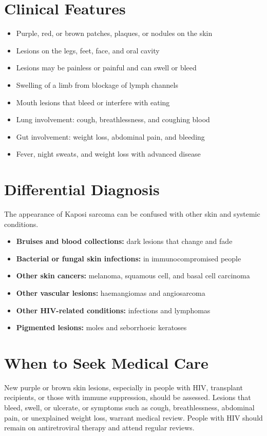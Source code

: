 \section*{Clinical Features}
\begin{itemize}
    \item Purple, red, or brown patches, plaques, or nodules on the skin
    \item Lesions on the legs, feet, face, and oral cavity
    \item Lesions may be painless or painful and can swell or bleed
    \item Swelling of a limb from blockage of lymph channels
    \item Mouth lesions that bleed or interfere with eating
    \item Lung involvement: cough, breathlessness, and coughing blood
    \item Gut involvement: weight loss, abdominal pain, and bleeding
    \item Fever, night sweats, and weight loss with advanced disease
\end{itemize}

\section*{Differential Diagnosis}
The appearance of Kaposi sarcoma can be confused with other skin and systemic conditions.
\begin{itemize}
    \item \textbf{Bruises and blood collections:} dark lesions that change and fade
    \item \textbf{Bacterial or fungal skin infections:} in immunocompromised people
    \item \textbf{Other skin cancers:} melanoma, squamous cell, and basal cell carcinoma
    \item \textbf{Other vascular lesions:} haemangiomas and angiosarcoma
    \item \textbf{Other HIV-related conditions:} infections and lymphomas
    \item \textbf{Pigmented lesions:} moles and seborrhoeic keratoses
\end{itemize}

\section*{When to Seek Medical Care}
New purple or brown skin lesions, especially in people with HIV, transplant recipients, or those with immune suppression, should be assessed. Lesions that bleed, swell, or ulcerate, or symptoms such as cough, breathlessness, abdominal pain, or unexplained weight loss, warrant medical review. People with HIV should remain on antiretroviral therapy and attend regular reviews.

